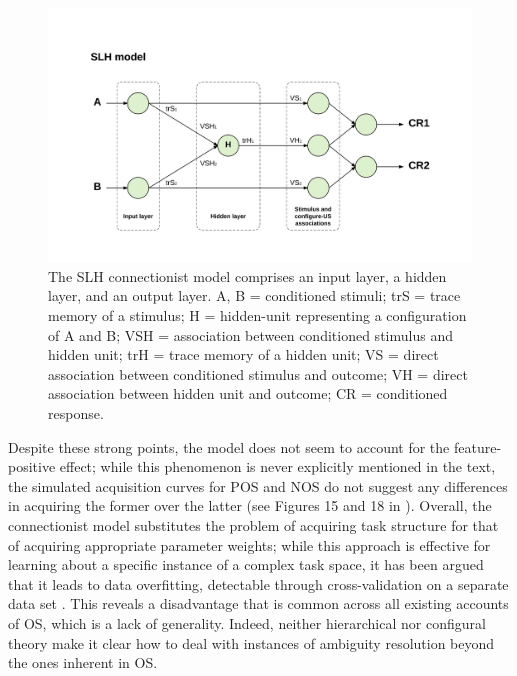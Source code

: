 \documentclass[11pt]{article}
\let\cite=\citep
\let\citeNP=\citealt
\begin{document}
\begin{figure}[h]
\centering
\includegraphics[width=\textwidth]{Figures/Fig4}
\caption{The SLH connectionist model comprises an input layer, a hidden layer, 
and an output layer. A, B = conditioned stimuli; trS = trace memory of a 
stimulus; H = hidden-unit representing a configuration of A and B; VSH = 
association between conditioned stimulus and hidden unit; trH = trace memory of 
a hidden unit; VS = direct association between conditioned stimulus and outcome; 
VH = direct association between hidden unit and outcome; CR = conditioned 
response.}
\label{fig:SLH}
\end{figure}

Despite these strong points, the model does not seem to account for the 
feature-positive effect; while this phenomenon is never explicitly mentioned in 
the text, the simulated acquisition curves for POS and NOS do not suggest any 
differences in acquiring the former over the latter (see Figures 15 and 18 in 
\citeNP{Schmajuk1998}). Overall, the connectionist model substitutes the 
problem of acquiring task structure for that of acquiring appropriate parameter 
weights; while this approach is effective for learning about a specific 
instance of a complex task space, it has been argued that it leads to data 
overfitting, detectable through cross-validation on a separate data set 
\cite{Fuhs2007}. This reveals a disadvantage that is common across all existing 
accounts of OS, which is a lack of generality. Indeed, neither hierarchical nor 
configural theory make it clear how to deal with instances of ambiguity 
resolution beyond the ones inherent in OS. 
\end{document}
